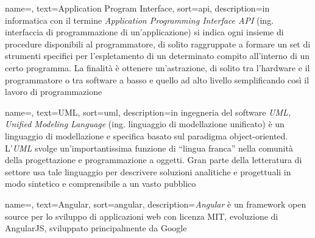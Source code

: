 
\renewcommand{\acronymname}{Acronimi e abbreviazioni}


    


{
    name=,
    text=Application Program Interface,
    sort=api,
    description={in informatica con il termine \emph{Application Programming Interface API} (ing. interfaccia di programmazione di un'applicazione) si indica ogni insieme di procedure disponibili al programmatore, di solito raggruppate a formare un set di strumenti specifici per l'espletamento di un determinato compito all'interno di un certo programma. La finalità è ottenere un'astrazione, di solito tra l'hardware e il programmatore o tra software a basso e quello ad alto livello semplificando così il lavoro di programmazione}
}

{
    name=,
    text=UML,
    sort=uml,
    description={in ingegneria del software \emph{UML, Unified Modeling Language} (ing. linguaggio di modellazione unificato) è un linguaggio di modellazione e specifica basato sul paradigma object-oriented. L'\emph{UML} svolge un'importantissima funzione di ``lingua franca'' nella comunità della progettazione e programmazione a oggetti. Gran parte della letteratura di settore usa tale linguaggio per descrivere soluzioni analitiche e progettuali in modo sintetico e comprensibile a un vasto pubblico}
}

{
    name=,
    text=Angular,
    sort=angular,
    description={\emph{Angular} è un framework open source per lo sviluppo di applicazioni web con licenza MIT, evoluzione di AngularJS, sviluppato principalmente da Google}
}

